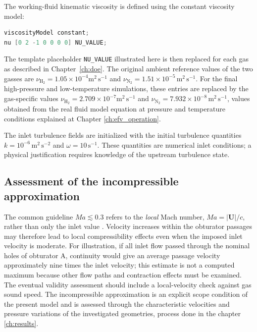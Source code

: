 The working-fluid kinematic viscosity is defined using the constant viscosity model:
\begin{lstlisting}[language=C++,caption={Parameterized constant-viscosity entry used in the OpenFOAM setup.}, captionpos=b]
viscosityModel constant;
nu [0 2 -1 0 0 0 0] NU_VALUE;
\end{lstlisting}

The template placeholder \texttt{NU\_VALUE} illustrated here is then replaced for each gas as described in Chapter~\ref{ch:doe}. The original ambient reference values of the two gasses are $\nu_{\mathrm{H}_2}=1.05\times10^{-4}\mathrm{m^2\,s^{-1}}$ and $\nu_{\mathrm{N}_2}=1.51\times10^{-5}\,\mathrm{m^2\,s^{-1}}$. For the final high-pressure and low-temperature simulations, these entries are replaced by the gas-specific values $\nu_{\mathrm{H}_2}=2.709\times10^{-7}\mathrm{m^2\,s^{-1}}$ and $\nu_{\mathrm{N}_2}=7.932\times10^{-8}\,\mathrm{m^2\,s^{-1}}$, values obtained from the real fluid model equation at pressure and temperature conditions explained at Chapter \ref{ch:efv_operation}.

The inlet turbulence fields are initialized with the initial turbulence quantities $k=10^{-6}\,\mathrm{m^2\,s^{-2}}$ and $\omega=10\,\mathrm{s^{-1}}$. These quantities are numerical inlet conditions; a physical justification requires knowledge of the upstream turbulence state.

\subsection{Assessment of the incompressible approximation}
The common guideline $Ma\lesssim0.3$ refers to the \emph{local} Mach number, $Ma=|\mathbf{U}|/c$, rather than only the inlet value \cite{anderson2017}. Velocity increases within the obturator passages may therefore lead to local compressibility effects even when the imposed inlet velocity is moderate. For illustration, if all inlet flow passed through the nominal holes of obturator A, continuity would give an average passage velocity approximately nine times the inlet velocity; this estimate is not a computed maximum because other flow paths and contraction effects must be examined. The eventual validity assessment should include a local-velocity check against gas sound speed. The incompressible approximation is an explicit scope condition of the present model and is assessed through the characteristic velocities and pressure variations of the investigated geometries, process done in the chapter \ref{ch:results}.

